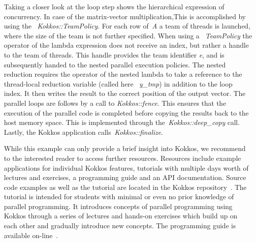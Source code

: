 Taking a closer look at the loop step shows the hierarchical expression of concurrency. In case of the matrix-vector multiplication,This is accomplished by using the ~\emph{Kokkos::TeamPolicy}. For each row of~\emph{A} a team of threads is launched, where the size of the team is not further specified. When using a ~\emph{TeamPolicy} the operator of the lambda expression does not receive an index, but rather a handle to the team of threads. 
This handle provides the team identifier \emph{e}, and is subsequently handed to the nested parallel execution policies. The nested reduction requires the operator of the nested lambda to take a reference to the thread-local reduction variable (called here ~\emph{y\_tmp}) in addition to the loop index. It then writes the result to the correct position of the output vector. 
The parallel loops are follows by a call to \emph{Kokkos::fence}. This ensures that the execution of the parallel code is completed before copying the results back to the host memory space. This is implemented through the~\emph{Kokkos::deep\_copy} call. Lastly, the Kokkos application calls~\emph{Kokkos::finalize}.

While this example can only provide a brief insight into Kokkos, we recommend to the interested reader to access further resources. Resources include example applications for individual Kokkos features, tutorials with multiple days worth of lectures and exercises, a programming guide and an API documentation. Source code examples as well as the tutorial are located in the Kokkos repository~\cite{KOKKOS_REPO}. The tutorial is intended for students with minimal or even no prior knowledge of parallel programming. It introduces concepts of parallel programming using Kokkos through a series of lectures and hands-on exercises which build up on each other and gradually introduce new concepts. The programming guide is available on-line~\cite{KOKKOS_WIKI}. 

